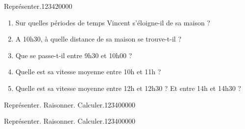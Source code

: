 \begin{pageParcoursu}
\begin{ExoCu}{Représenter.}{1234}{2}{0}{0}{0}{0}
\begin{enumerate}
\item Sur quelles périodes de temps Vincent s'éloigne-il de sa maison ? 
\item A 10h30, à quelle distance de sa maison se trouve-t-il ?
\item Que se passe-t-il entre 9h30 et 10h00 ?
\item Quelle est sa vitesse moyenne entre 10h et 11h ?
\item Quelle est sa vitesse moyenne entre 12h et 12h30 ? Et entre 14h et 14h30 ?
\end{enumerate}

\end{ExoCu}



\end{pageParcoursu} 
 
\begin{pageParcoursd} 


\begin{ExoCd}{Représenter. Raisonner. Calculer.}{1234}{0}{0}{0}{0}{0}

 

\end{ExoCd}



\begin{ExoCd}{Représenter. Raisonner. Calculer.}{1234}{0}{0}{0}{0}{0}

 

\end{ExoCd}
 



\end{pageParcoursd}
 
